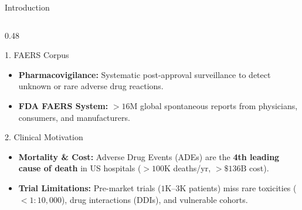 \documentclass[11pt, aspectratio=169]{beamer}
\begin{document}
\begin{frame}{Introduction}
    \begin{columns}[T]
        \begin{column}{0.48\textwidth}
            \begin{block}{\footnotesize 1. FAERS Corpus}
                \begin{itemize}\scriptsize
                    \item \textbf{Pharmacovigilance:} Systematic post-approval surveillance to detect unknown or rare adverse drug reactions.
                    \item \textbf{FDA FAERS System:} $>16\text{M}$ global spontaneous reports from physicians, consumers, and manufacturers.
                \end{itemize}
            \end{block}
            
            \vspace{0.02cm}
            \begin{alertblock}{\footnotesize 2. Clinical Motivation}
                \begin{itemize}\scriptsize
                    \item \textbf{Mortality \& Cost:} Adverse Drug Events (ADEs) are the \textbf{4th leading cause of death} in US hospitals ($>100\text{K}$ deaths/yr, $>\$136\text{B}$ cost).
                    \item \textbf{Trial Limitations:} Pre-market trials ($1\text{K}$--$3\text{K}$ patients) miss rare toxicities ($<1:10,000$), drug interactions (DDIs), and vulnerable cohorts.
                \end{itemize}
            \end{alertblock}
        \end{column}


\end{columns}
\end{frame}
\end{document}
